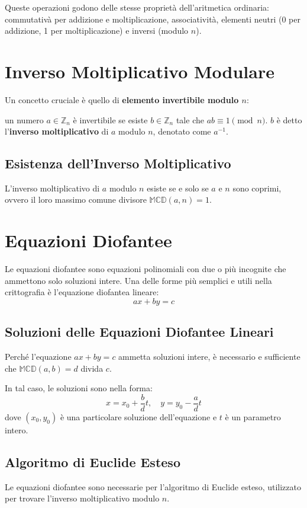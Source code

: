 \documentclass[a4paper,12pt]{report}
\begin{document}
Queste operazioni godono delle stesse proprietà dell'aritmetica ordinaria: commutativà per addizione e moltiplicazione, associatività, elementi neutri (0 per addizione, 1 per moltiplicazione) e inversi (modulo $n$).

\section{Inverso Moltiplicativo Modulare}

Un concetto cruciale è quello di \textbf{elemento invertibile modulo $n$}: 

un numero $a \in \mathbb{Z}_n$ è invertibile se esiste $b \in \mathbb{Z}_n$ tale che $ab \equiv 1 \pmod{n}$. $b$ è detto l'\textbf{inverso moltiplicativo} di $a$ modulo $n$, denotato come $a^{-1}$.

\subsection*{Esistenza dell'Inverso Moltiplicativo}
L'inverso moltiplicativo di $a$ modulo $n$ esiste se e solo se $a$ e $n$ sono coprimi, ovvero il loro massimo comune divisore $\mathbb{MCD}(a,n) = 1$. 

\section{Equazioni Diofantee}
Le equazioni diofantee sono equazioni polinomiali con due o più incognite che ammettono solo soluzioni intere. 
Una delle forme più semplici e utili nella crittografia è l'equazione diofantea lineare:
\[ax + by = c\]

\subsection*{Soluzioni delle Equazioni Diofantee Lineari}
Perché l'equazione $ax + by = c$ ammetta soluzioni intere, è necessario e sufficiente che $\mathbb{MCD}(a, b) = d$ divida $c$. 

In tal caso, le soluzioni sono nella forma:
\[x = x_0 + \frac{b}{d}t, \quad y = y_0 - \frac{a}{d}t\]
dove $(x_0, y_0)$ è una particolare soluzione dell'equazione e $t$ è un parametro intero.

\subsection*{Algoritmo di Euclide Esteso} \label{sec:inverso}   
Le equazioni diofantee sono necessarie per l'algoritmo di Euclide esteso, utilizzato per trovare l'inverso moltiplicativo modulo $n$.
\end{document}
